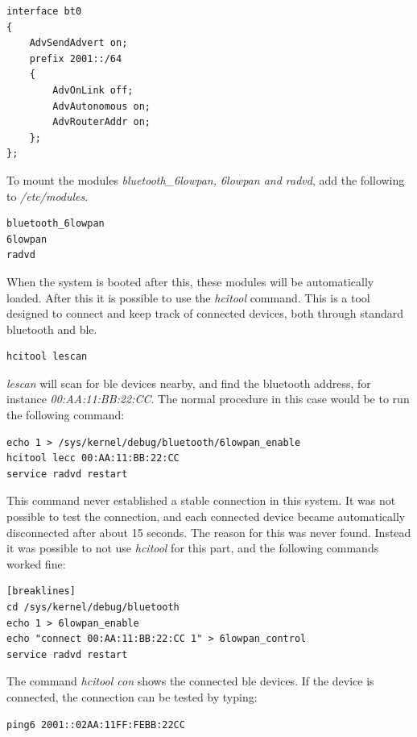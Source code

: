 \begin{verbatim}
interface bt0
{
    AdvSendAdvert on;
    prefix 2001::/64
    {
        AdvOnLink off;
        AdvAutonomous on;
        AdvRouterAddr on;
    };
};
\end{verbatim} 

To mount the modules \textit{bluetooth\_6lowpan, 6lowpan and radvd}, add the following to \textit{/etc/modules}. 

\begin{verbatim}
bluetooth_6lowpan
6lowpan
radvd
\end{verbatim}

When the system is booted after this, these modules will be automatically loaded. After this it is possible to use the \textit{hcitool} command. This is a tool designed to connect and keep track of connected devices, both through standard bluetooth and \gls{ble}. 

\begin{verbatim}
hcitool lescan
\end{verbatim}

\textit{lescan} will scan for \gls{ble} devices nearby, and find the bluetooth address, for instance \textit{00:AA:11:BB:22:CC}. The normal procedure in this case would be to run the following command: 

\begin{verbatim}
echo 1 > /sys/kernel/debug/bluetooth/6lowpan_enable
hcitool lecc 00:AA:11:BB:22:CC
service radvd restart
\end{verbatim}

This command never established a stable connection in this system. It was not possible to test the connection, and each connected device became automatically disconnected after about 15 seconds. The reason for this was never found. Instead it was possible to not use \textit{hcitool} for this part, and the following commands worked fine:

\begin{verbatim}[breaklines]
cd /sys/kernel/debug/bluetooth
echo 1 > 6lowpan_enable
echo "connect 00:AA:11:BB:22:CC 1" > 6lowpan_control
service radvd restart
\end{verbatim} 

The command \textit{hcitool con} shows the connected \gls{ble} devices. If the device is connected, the connection can be tested by typing:

\begin{verbatim}
ping6 2001::02AA:11FF:FEBB:22CC
\end{verbatim}



